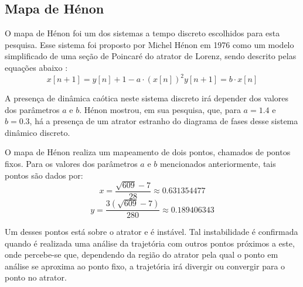\documentclass[a4paper, 12pt]{article}
\begin{document}
\subsection{Mapa de Hénon}

O mapa de Hénon foi um dos sistemas a tempo discreto escolhidos para esta pesquisa. Esse sistema foi proposto por Michel Hénon em 1976 como um modelo simplificado de uma seção de Poincaré do atrator de Lorenz, sendo descrito pelas equações abaixo \cite{henon1976two}:
\begin{subequations}
\begin{equation}
x[n+1] = y[n] + 1 - a\cdot (x[n])^2
\end{equation}
\begin{equation}
y[n+1] = b \cdot x[n]
\end{equation}
\end{subequations}

A presença de dinâmica caótica neste sistema discreto irá depender dos valores dos parâmetros $a$ e $b$. Hénon mostrou, em sua pesquisa, que, para $a = 1.4$ e $b = 0.3$, há a presença de um atrator estranho do diagrama de fases desse sistema dinâmico discreto. 

O mapa de Hénon realiza um mapeamento de dois pontos, chamados de pontos fixos. Para os valores dos parâmetros $a$ e $b$ mencionados anteriormente, tais pontos são dados por:
$$x = \frac{\sqrt{609}-7}{28} \approx 0.631354477$$
$$y = \frac{3(\sqrt{609}-7)}{280} \approx 0.189406343$$

Um desses pontos está sobre o atrator e é instável. Tal instabilidade é confirmada quando é realizada uma análise da trajetória com outros pontos próximos a este, onde percebe-se que, dependendo da região do atrator pela qual o ponto em análise se aproxima ao ponto fixo, a trajetória irá divergir ou convergir para o ponto no atrator. 
\end{document}
